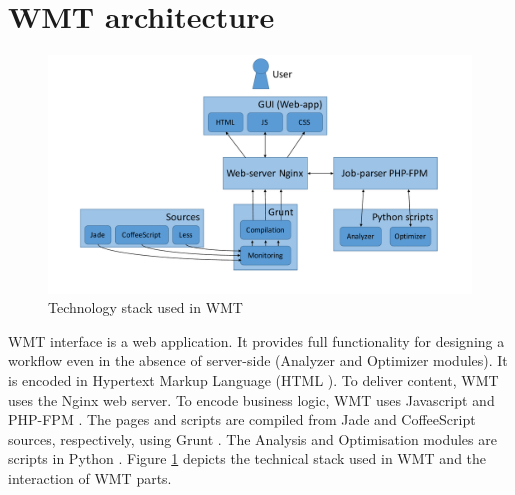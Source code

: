 \documentclass[12pt,openany,onecolumn]{book}
\begin{document}
\section{WMT architecture}\label{sec:interface}

\begin{figure}[h]
\centering
\includegraphics[width=\linewidth]{figs/tech_stack}
\caption{Technology stack used in WMT}\label{fig:tech_stack}
\end{figure}

WMT interface is a web application. It provides full functionality for designing a workflow even in the absence of server-side (Analyzer and Optimizer modules).
It is encoded in Hypertext Markup Language (HTML \cite{html}). To deliver content, WMT uses the Nginx \cite{nginx} web server. To encode business logic, WMT uses Javascript \cite{javascript} and PHP-FPM \cite{php-fpm}. The pages and scripts are compiled from Jade \cite{jade} and CoffeeScript \cite{coffescript} sources, respectively, using Grunt \cite{grunt}. The Analysis and Optimisation modules are scripts in Python \cite{python}. Figure \ref{fig:tech_stack} depicts the technical stack used in WMT and the interaction of WMT parts.
\end{document}

